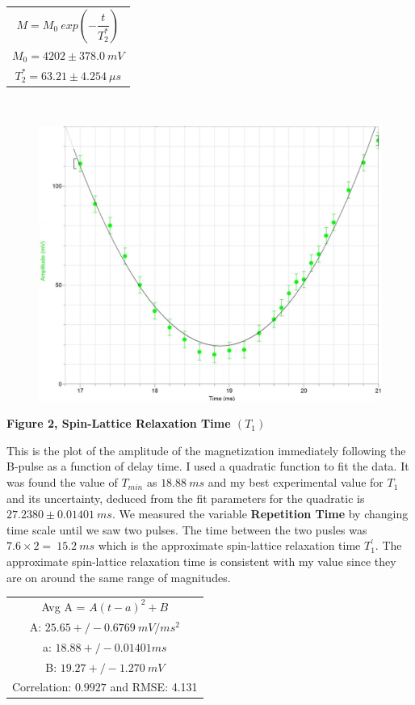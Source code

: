\documentclass[fleqn]{article}
\begin{document}
  \begin{center}
    \begin{tabular}{ |c| } 
     \hline
     $M=M_0 ~ exp \left(-\dfrac{t}{T_2^*}\right)$  \\ 
     $M_0=4202 \pm 378.0 ~ mV$ \\ 
     $T_2^*=63.21 \pm 4.254 ~ \mu s$ \\
     \hline
    \end{tabular}
  \end{center}
        
  \pagebreak

  \includegraphics[height=9cm, width=14cm]{Fig2.JPG}

  \textbf{Figure 2, Spin-Lattice Relaxation Time $(T_1)$}

  \vspace{10px}

  This is the plot of the amplitude of the magnetization immediately following the B-pulse as a function of delay time. 
  I used a quadratic function to fit the data. It was found the value of $T_{min}$ as $18.88 ~ ms$ and my best 
  experimental value for $T_1$ and its uncertainty, deduced from the fit parameters for the quadratic is
  $27.2380 \pm 0.01401 ~ ms$. 
  We measured the variable \textbf{Repetition Time} by changing time scale until we saw two pulses. The time between the 
  two pusles was $7.6 \times 2= ~ 15.2 ~ ms$ which is the approximate spin-lattice relaxation time $T_1^'$. The 
  approximate spin-lattice relaxation time is consistent with my value since they are on around the same range of magnitudes.

  \begin{center}
    \begin{tabular}{ |c| } 
     \hline
     Avg A = $A(t-a)^2+B$  \\ 
     A: $25.65 +/- 0.6769 ~ mV/ms^2$ \\
     a: $18.88 +/- 0.01401 ms$ \\ 
     B: $19.27 +/- 1.270 ~ mV$  \\ 
     Correlation: $0.9927$ and RMSE: 4.131 \\
     \hline
    \end{tabular}
  \end{center}
\end{document}
